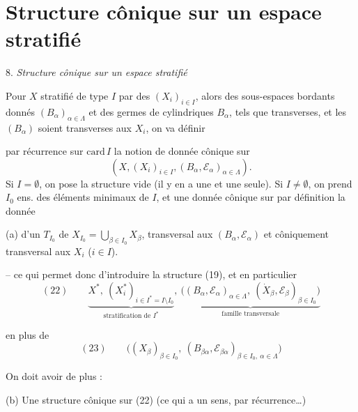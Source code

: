 \documentclass[11pt,a4paper]{article}
\begin{document}
\section*{Structure cônique sur un espace stratifié}

8. \emph{Structure cônique sur un espace stratifié}

Pour $X$ stratifié de type  $I$ par des $(X_i)_{i\in I}$, alors des sous-espaces bordants donnés $(B_\alpha)_{\alpha\in\Lambda}$ et des  germes de  cylindriques  $B_\alpha$, tels que   transverses, et les $(B_\alpha)$ soient transverses aux $X_i$, on va  définir


par récurrence sur $\mathrm{card}\,I$ la notion de donnée  cônique sur 
\[
(X,(X_i)_{i\in I},(B_\alpha,\mathcal E_\alpha)_{\alpha\in\Lambda}).
\]  Si $I=\emptyset$, on pose la structure vide (il y en a une et une seule). Si $I\neq\emptyset$, on prend $I_0$ ens. des éléments minimaux de $I$, et une donnée cônique sur par définition la donnée

(a) d'un \struck{\ill{}}  $T_{I_0}$ de \struck{\ill{}} $X_{I_0}=\bigcup_{\beta\in I_0}X_\beta$, transversal aux $(B_\alpha,\mathcal E_\alpha)$ et  côniquement transversal aux $X_i$ ($i\in I$).

-- ce qui permet donc d'introduire la structure (19), et en particulier
\[
(22)\qquad \underbrace{X^{*},\ (X^{*}_i)_{i\in I^{*}=I\setminus I_0}}_{\text{stratification de } I^{*}},\ 
\underbrace{\bigl((B_\alpha,\mathcal E_\alpha)_{\alpha\in\Lambda},\ (\dot X_\beta,\mathcal E_\beta)_{\beta\in I_0}\bigr)}_{\text{famille transversale}}
\]

en plus de
\[
(23)\qquad \bigl((X_\beta)_{\beta\in I_0},\ (B_{\beta\alpha},\mathcal E_{\beta\alpha})_{\beta\in I_0,\ \alpha\in\Lambda}\bigr)
\]

On doit avoir de plus :

(b) Une structure cônique sur (22) (ce qui a un sens, par récurrence\ldots)
\end{document}
